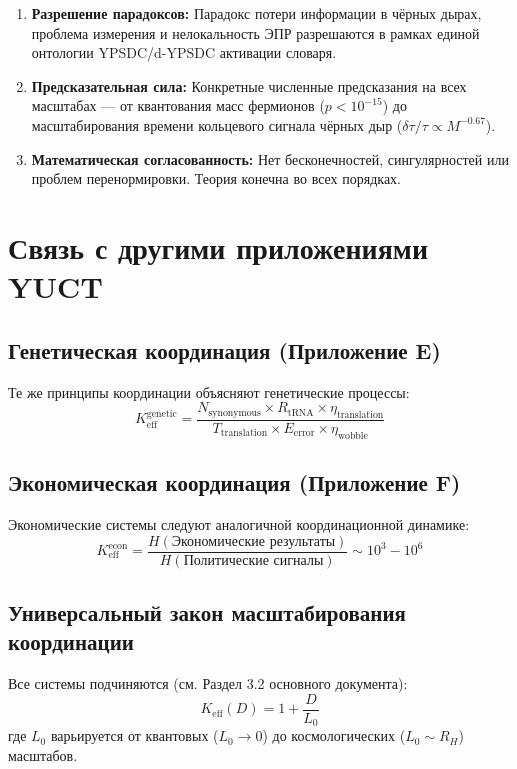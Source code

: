 \documentclass[12pt,a4paper]{article}
\theoremstyle{remark}
\newcommand{\Keff}{K_{\mathrm{eff}}}
\begin{document}
\begin{enumerate}
		\item \textbf{Разрешение парадоксов:} Парадокс потери информации в чёрных дырах, проблема измерения и нелокальность ЭПР разрешаются в рамках единой онтологии YPSDC/d-YPSDC активации словаря.
		
		\item \textbf{Предсказательная сила:} Конкретные численные предсказания на всех масштабах — от квантования масс фермионов ($p<10^{-15}$) до масштабирования времени кольцевого сигнала чёрных дыр ($\delta\tau/\tau\propto M^{-0.67}$).
		
		\item \textbf{Математическая согласованность:} Нет бесконечностей, сингулярностей или проблем перенормировки. Теория конечна во всех порядках.
	\end{enumerate}
	
	\section{Связь с другими приложениями YUCT}
	\label{sec:connections}
	
	\subsection{Генетическая координация (Приложение E)}
	
	Те же принципы координации объясняют генетические процессы:
	\[
	K_{\text{eff}}^{\text{genetic}} = \frac{N_{\text{synonymous}} \times R_{\text{tRNA}} \times \eta_{\text{translation}}}{T_{\text{translation}} \times E_{\text{error}} \times \eta_{\text{wobble}}}
	\]
	
	\subsection{Экономическая координация (Приложение F)}
	
	Экономические системы следуют аналогичной координационной динамике:
	\[
	K_{\text{eff}}^{\text{econ}} = \frac{H(\text{Экономические результаты})}{H(\text{Политические сигналы})} \sim 10^3-10^6
	\]
	
	\subsection{Универсальный закон масштабирования координации}
	
	Все системы подчиняются (см. Раздел 3.2 основного документа):
	\[
	\boxed{\Keff(D) = 1 + \frac{D}{L_0}}
	\]
	где $L_0$ варьируется от квантовых ($L_0 \to 0$) до космологических ($L_0 \sim R_H$) масштабов.
	
\end{document}
